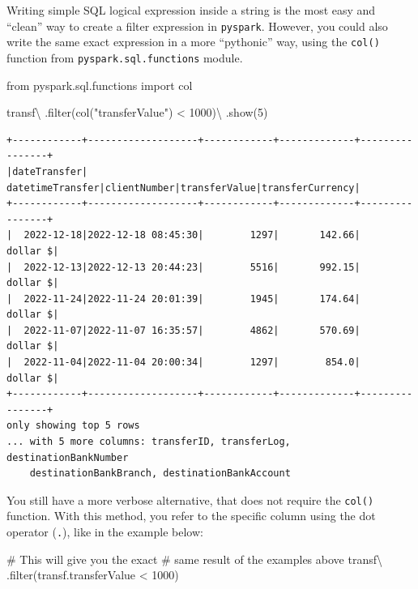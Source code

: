 \documentclass[
  11pt,
  letterpaper,
  DIV=11,
  numbers=noendperiod]{scrreprt}
\newenvironment{Shaded}{\begin{snugshade}}{\end{snugshade}}
\newcommand{\BuiltInTok}[1]{\textcolor[rgb]{0.00,0.23,0.31}{#1}}
\newcommand{\CommentTok}[1]{\textcolor[rgb]{0.37,0.37,0.37}{#1}}
\newcommand{\DecValTok}[1]{\textcolor[rgb]{0.68,0.00,0.00}{#1}}
\newcommand{\ImportTok}[1]{\textcolor[rgb]{0.00,0.46,0.62}{#1}}
\newcommand{\NormalTok}[1]{\textcolor[rgb]{0.00,0.23,0.31}{#1}}
\newcommand{\OperatorTok}[1]{\textcolor[rgb]{0.37,0.37,0.37}{#1}}
\newcommand{\StringTok}[1]{\textcolor[rgb]{0.13,0.47,0.30}{#1}}
\begin{document}
Writing simple SQL logical expression inside a string is the most easy
and ``clean'' way to create a filter expression in \texttt{pyspark}.
However, you could also write the same exact expression in a more
``pythonic'' way, using the \texttt{col()} function from
\texttt{pyspark.sql.functions} module.

\begin{Shaded}
\begin{Highlighting}[]
\ImportTok{from}\NormalTok{ pyspark.sql.functions }\ImportTok{import}\NormalTok{ col}

\NormalTok{transf}\OperatorTok{\textbackslash{}}
\NormalTok{  .}\BuiltInTok{filter}\NormalTok{(col(}\StringTok{"transferValue"}\NormalTok{) }\OperatorTok{\textless{}} \DecValTok{1000}\NormalTok{)}\OperatorTok{\textbackslash{}}
\NormalTok{  .show(}\DecValTok{5}\NormalTok{)}
\end{Highlighting}
\end{Shaded}

\begin{verbatim}
+------------+-------------------+------------+-------------+----------------+
|dateTransfer|   datetimeTransfer|clientNumber|transferValue|transferCurrency|
+------------+-------------------+------------+-------------+----------------+
|  2022-12-18|2022-12-18 08:45:30|        1297|       142.66|        dollar $|
|  2022-12-13|2022-12-13 20:44:23|        5516|       992.15|        dollar $|
|  2022-11-24|2022-11-24 20:01:39|        1945|       174.64|        dollar $|
|  2022-11-07|2022-11-07 16:35:57|        4862|       570.69|        dollar $|
|  2022-11-04|2022-11-04 20:00:34|        1297|        854.0|        dollar $|
+------------+-------------------+------------+-------------+----------------+
only showing top 5 rows
... with 5 more columns: transferID, transferLog, destinationBankNumber
    destinationBankBranch, destinationBankAccount
\end{verbatim}

You still have a more verbose alternative, that does not require the
\texttt{col()} function. With this method, you refer to the specific
column using the dot operator (\texttt{.}), like in the example below:

\begin{Shaded}
\begin{Highlighting}[]
\CommentTok{\# This will give you the exact}
\CommentTok{\# same result of the examples above}
\NormalTok{transf}\OperatorTok{\textbackslash{}}
\NormalTok{  .}\BuiltInTok{filter}\NormalTok{(transf.transferValue }\OperatorTok{\textless{}} \DecValTok{1000}\NormalTok{)}
\end{Highlighting}
\end{Shaded}
\end{document}
